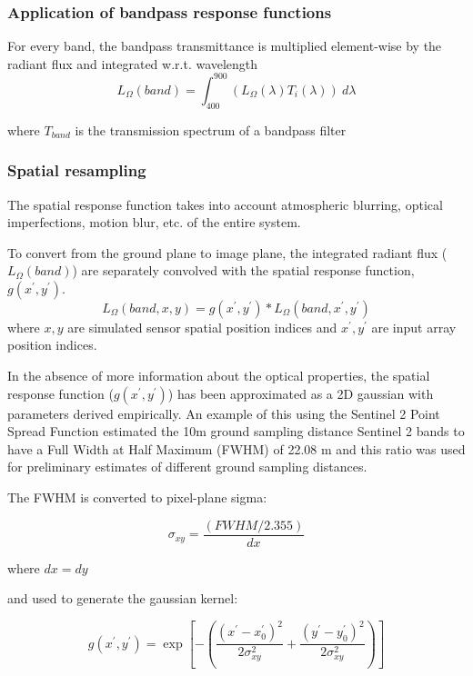 \documentclass[10pt,a4paper,final,twocolumn]{article}
\begin{document}
\subsubsection{Application of bandpass response functions}
For every band, the bandpass transmittance is multiplied element-wise by the radiant flux and integrated w.r.t. wavelength
\begin{equation}
L_{\Omega}(band)= \int_{400}^{900}(L_{\Omega}(\lambda)T_i(\lambda))~d\lambda
\end{equation}

where $T_{band}$ is the transmission spectrum of a bandpass filter

\subsubsection{Spatial resampling}
The spatial response function takes into account atmospheric blurring, optical imperfections, motion blur, etc. of the entire system.

To convert from the ground plane to image plane, the integrated radiant flux ($L_{\Omega}(band)$) are separately convolved with the spatial response function, $g(x^\prime,y^\prime)$.
\begin{equation}
L_{\Omega}(band, x, y) = g(x^\prime, y^\prime) * L_{\Omega}(band, x^\prime, y^\prime)
\end{equation}
where $x, y$ are simulated sensor spatial position indices and $x^{\prime}, y^{\prime}$ are input array position indices.

In the absence of more information about the optical properties, the spatial response function ($g(x^\prime, y^\prime)$) has been approximated as a 2D gaussian with parameters derived empirically. An example of this using the Sentinel 2 Point Spread Function estimated the 10m ground sampling distance Sentinel 2 bands to have a Full Width at Half Maximum (FWHM) of 22.08 m and this ratio was used for preliminary estimates of different ground sampling distances.

The FWHM is converted to pixel-plane sigma:

\begin{equation}
\sigma_{xy} = \frac{(FWHM/2.355)}{dx}
\end{equation}

where $dx = dy$

and used to generate the gaussian kernel:

\begin{equation}
g(x^\prime, y^\prime) =\exp \left[-\left({\frac {(x^\prime-x_{0}^\prime)^{2}}{2\sigma _{xy}^{2}}}+{\frac {(y^\prime-y^\prime_{0})^{2}}{2\sigma _{xy}^{2}}}\right)\right]
\end{equation}
\end{document}

